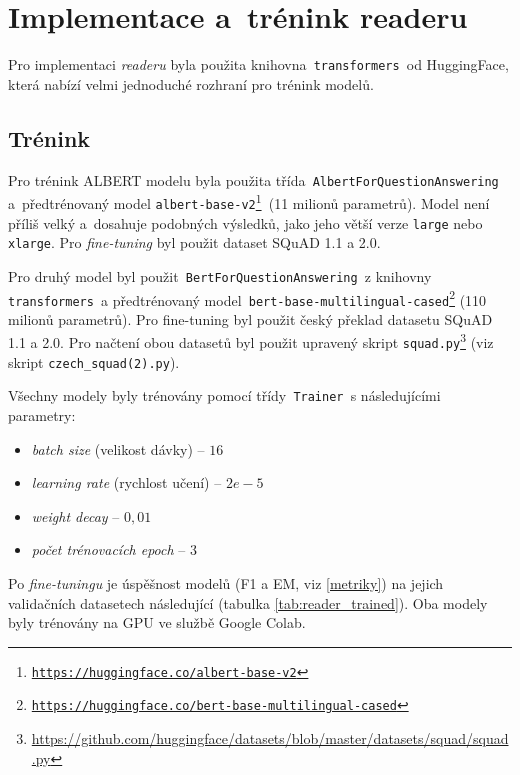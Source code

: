 \section{Implementace a~trénink readeru}
\label{reader_imp}
Pro implementaci \emph{readeru} byla použita knihovna\texttt{ transformers }od HuggingFace, která nabízí velmi jednoduché rozhraní pro trénink modelů.\par

\subsection{Trénink}
Pro trénink ALBERT modelu byla použita třída\texttt{ AlbertForQuestionAnswering }a~předtrénovaný model \texttt{albert-base-v2\footnote{\url{https://huggingface.co/albert-base-v2}} }(11 milionů parametrů). Model není příliš velký a~dosahuje podobných výsledků, jako jeho větší verze \texttt{large} nebo \texttt{xlarge}. Pro \emph{fine-tuning} byl použit dataset SQuAD 1.1 a 2.0.\par
Pro druhý model byl použit\texttt{ BertForQuestionAnswering }z knihovny\texttt{ transformers }a předtrénovaný model\texttt{ bert-base-multilingual-cased\footnote{\url{https://huggingface.co/bert-base-multilingual-cased}}} (110 milionů parametrů). Pro fine-tuning byl použit český překlad datasetu SQuAD 1.1 a 2.0. Pro načtení obou datasetů byl použit upravený skript \texttt{squad.py}\footnote{\url{https://github.com/huggingface/datasets/blob/master/datasets/squad/squad.py}} (viz skript \texttt{czech\_squad(2).py}).\par
Všechny modely byly trénovány pomocí třídy\texttt{ Trainer }s následujícími parametry:
\begin{itemize}
    \item \emph{batch size} (velikost dávky) -- $16$
    \item \emph{learning rate} (rychlost učení) -- $2e\!-\!5$
    \item \emph{weight decay} -- $0,01$
    \item \emph{počet trénovacích epoch} -- $3$
\end{itemize}

Po \emph{fine-tuningu} je úspěšnost modelů (F1 a EM, viz \ref{metriky}) na jejich validačních datasetech následující (tabulka \ref{tab:reader_trained}). Oba modely byly trénovány na GPU ve službě Google Colab.

